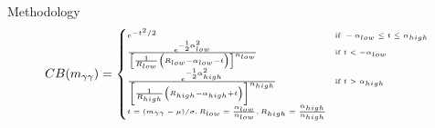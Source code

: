 \begin{frame}{Methodology}
    \begin{equation}
      \tiny
      CB(m_{\gamma \gamma}) = 
      \begin{cases}
        e^{-t^{2}/2} & \text{if } -\alpha_{low} \leq t \leq \alpha_{high} \\
        \frac{ e^{-{}^{1}_{2} \alpha_{low}^{2}} } { \left[ \frac{1}{R_{low}} \left(R_{low} - \alpha_{low} - t \right) \right]^{n_{low}} } & \text{if } t < -\alpha_{low} \\
        \frac{ e^{-{}^{1}_{2} \alpha_{high}^{2}} } { \left[ \frac{1}{R_{high}} \left(R_{high} - \alpha_{high} + t \right) \right]^{n_{high}} } & \text{if } t > \alpha_{high} \\
        t=(m_{\gamma\gamma}-\mu)/\sigma, R_{low}=\frac{\alpha_{low}}{n_{low}},  R_{high}=\frac{\alpha_{high}}{n_{high}} \\
      \end{cases}
    \end{equation}
\end{frame}

